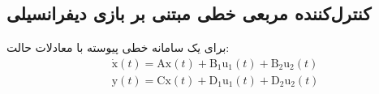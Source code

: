 

\subsection{کنترل‌کننده مربعی خطی مبتنی بر بازی دیفرانسیلی}\label{LQDG}
برای یک سامانه خطی پیوسته با معادلات حالت:
 \begin{equation}\label{systemlqdg}
 	\begin{split}
	&\boldsymbol{\dot{\mathrm{x}}}(t) = \boldsymbol{\mathrm{Ax}}(t) + \boldsymbol{\mathrm{B_1u_1}}(t) + \boldsymbol{\mathrm{B_2u_2}}(t)%
	\\
	&\boldsymbol{\mathrm{y}}(t) = \boldsymbol{\mathrm{Cx}}(t) + \boldsymbol{\mathrm{D_1u_1}}(t) + \boldsymbol{\mathrm{D_2u_2}}(t)
\end{split}
\end{equation}
